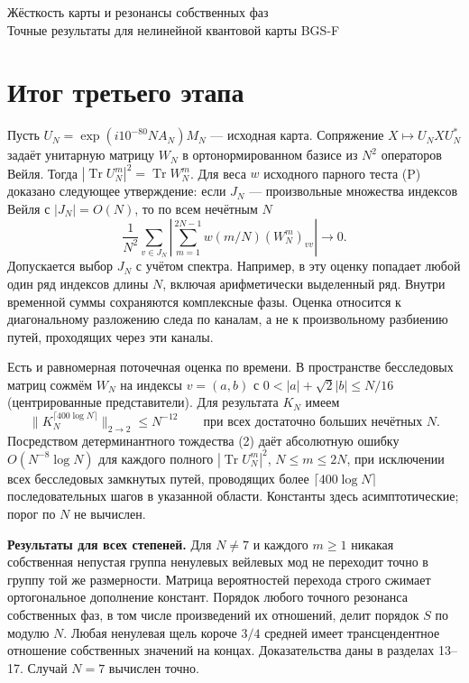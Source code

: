 \documentclass[11pt,a4paper]{article}
\newcommand{\Tr}{\operatorname{Tr}}
\newcommand{\sect}[1]{\section*{\sffamily\color{ink}#1}}
\newcommand{\subt}[1]{\par\medskip\noindent\textbf{#1.}\quad}
\begin{document}
\begin{center}{\LARGE\sffamily Жёсткость карты и резонансы собственных фаз}\\[4pt]
{\large Точные результаты для нелинейной квантовой карты BGS-F}
\end{center}
\sect{Итог третьего этапа}
Пусть $U_N=\exp(i10^{-80}NA_N)M_N$ --- исходная карта. Сопряжение $X\mapsto U_NXU_N^*$ задаёт унитарную матрицу $W_N$ в ортонормированном базисе из $N^2$ операторов Вейля. Тогда $|\Tr U_N^m|^2=\Tr W_N^m$. Для веса $w$ исходного парного теста (P) доказано следующее утверждение: если $J_N$ --- произвольные множества индексов Вейля с $|J_N|=O(N)$, то по всем нечётным $N$
\[
 \boxed{\quad\frac1{N^2}\sum_{v\in J_N}
 \left|\sum_{m=1}^{2N-1} w(m/N)(W_N^m)_{vv}\right|\longrightarrow0.\quad} \tag{1}
\]
Допускается выбор $J_N$ с учётом спектра. Например, в эту оценку попадает любой один ряд индексов длины $N$, включая арифметически выделенный ряд. Внутри временной суммы сохраняются комплексные фазы. Оценка относится к диагональному разложению следа по каналам, а не к произвольному разбиению путей, проходящих через эти каналы.

Есть и равномерная поточечная оценка по времени. В пространстве бесследовых матриц сожмём $W_N$ на индексы $v=(a,b)$ с $0<|a|+\sqrt2|b|\le N/16$ (центрированные представители). Для результата $K_N$ имеем
\[
 \|K_N^{\lceil400\log N\rceil}\|_{2\to2}\le N^{-12}
 \qquad\text{при всех достаточно больших нечётных }N.                   \tag{2}
\]
Посредством детерминантного тождества (2) даёт абсолютную ошибку $O(N^{-8}\log N)$ для каждого полного $|\Tr U_N^m|^2$, $N\le m\le2N$, при исключении всех бесследовых замкнутых путей, проводящих более $\lceil400\log N\rceil$ последовательных шагов в указанной области. Константы здесь асимптотические; порог по $N$ не вычислен.

\subt{Результаты для всех степеней} Для $N\ne7$ и каждого $m\ge1$ никакая собственная непустая группа ненулевых вейлевых мод не переходит точно в группу той же размерности. Матрица вероятностей перехода строго сжимает ортогональное дополнение констант. Порядок любого точного резонанса собственных фаз, в том числе произведений их отношений, делит порядок $S$ по модулю $N$. Любая ненулевая щель короче $3/4$ средней имеет трансцендентное отношение собственных значений на концах. Доказательства даны в разделах 13--17. Случай $N=7$ вычислен точно.
\end{document}
